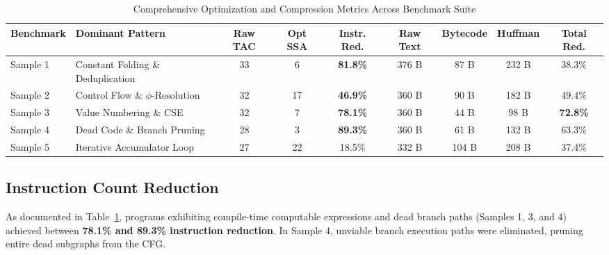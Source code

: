 \documentclass{ieeeaccess}
\begin{document}
\begin{table}[t]
\caption{Comprehensive Optimization and Compression Metrics Across Benchmark Suite}
\label{tab:benchmarks} %
\centering
\begin{tabularx}{\textwidth}{l X c c c c c c c}
\toprule
\textbf{Benchmark} & \textbf{Dominant Pattern} & \textbf{Raw TAC} & \textbf{Opt SSA} & \textbf{Instr. Red.} & \textbf{Raw Text} & \textbf{Bytecode} & \textbf{Huffman} & \textbf{Total Red.} \\
\midrule
Sample 1 & Constant Folding \& Deduplication & 33 & 6 & \textbf{81.8\%} & 376 B & 87 B & 232 B & 38.3\% \\
Sample 2 & Control Flow \& $\phi$-Resolution & 32 & 17 & \textbf{46.9\%} & 360 B & 90 B & 182 B & 49.4\% \\
Sample 3 & Value Numbering \& CSE & 32 & 7 & \textbf{78.1\%} & 360 B & 44 B & 98 B & \textbf{72.8\%} \\
Sample 4 & Dead Code \& Branch Pruning & 28 & 3 & \textbf{89.3\%} & 360 B & 61 B & 132 B & 63.3\% \\
Sample 5 & Iterative Accumulator Loop & 27 & 22 & 18.5\% & 332 B & 104 B & 208 B & 37.4\% \\
\bottomrule
\end{tabularx}
\end{table}

\subsection{Instruction Count Reduction}
As documented in Table~\ref{tab:benchmarks}, programs exhibiting compile-time computable expressions and dead branch paths (Samples 1, 3, and 4) achieved between \textbf{78.1\% and 89.3\% instruction reduction}. In Sample 4, unviable branch execution paths were eliminated, pruning entire dead subgraphs from the CFG.
\end{document}
